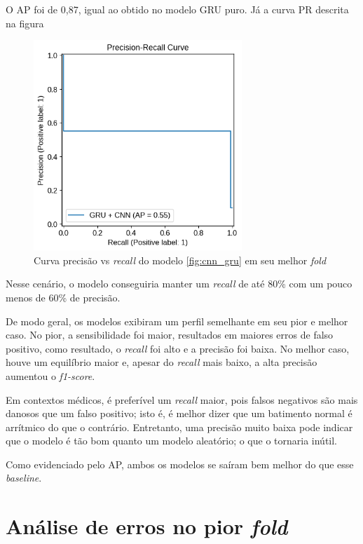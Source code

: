 \documentclass[
    12pt,                %
    openright,           %
    oneside,             %
    a4paper,             %
    brazil               %
]{abntex2}
\begin{document}
O AP foi de 0,87, igual ao obtido no modelo GRU puro. Já a curva PR descrita na figura

\begin{figure}[H]
  \centering
   \includegraphics[width=0.7\textwidth]{figuras/modelos_resultados/gru_cnn/ap_gru_cnn_pior_fold_3.png} 
  \caption{Curva precisão vs \textit{recall} do modelo \ref{fig:cnn_gru} em seu melhor \textit{fold}}
  \label{fig:ap_cnn_gru_pior_fold}
\end{figure}

Nesse cenário, o modelo conseguiria manter um \textit{recall} de até 80\% com um pouco menos de 60\% de precisão.

De modo geral, os modelos exibiram um perfil semelhante em seu pior e melhor caso. No pior, a sensibilidade foi maior, resultados
em maiores erros de falso positivo, como resultado, o \textit{recall} foi alto e a precisão foi baixa. No melhor caso, houve um 
equilíbrio maior e, apesar do \textit{recall} mais baixo, a alta precisão aumentou o \textit{f1-score}.

Em contextos médicos, é preferível um \textit{recall} maior, pois falsos negativos são mais danosos que um falso positivo; isto é, é melhor
dizer que um batimento normal é arrítmico do que o contrário. Entretanto, uma precisão muito baixa pode indicar que o modelo é 
tão bom quanto um modelo aleatório; o que o tornaria inútil. 

Como evidenciado pelo AP, ambos os modelos se saíram bem melhor do que esse \textit{baseline}.

\chapter{Análise de erros no pior \textit{fold}}
\label{ch:analise_erros_pior_fold}
\end{document}
